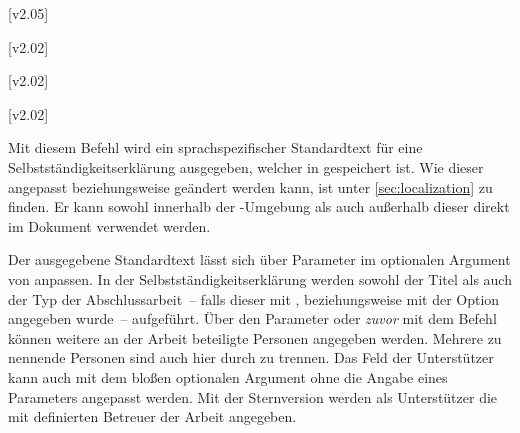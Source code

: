 \begin{DeclareEntity*}{}
\begin{DeclareEntity*}{}
\begin{DeclareEntity*}{}
\begin{Declaration}
  {}
\begin{Declaration}
  {}
  [v2.05]
\begin{Declaration}
  {}
\begin{Declaration}
  {}
\begin{Declaration}
  {}
\begin{Declaration}
  {}
\begin{Declaration}
  {}
  [v2.02]
\begin{Declaration}
  {}
  [v2.02]
\begin{Declaration}
  {}
  [v2.02]
\begin{Declaration}
  {}
\printdeclarationlist[Datum]

Mit diesem Befehl wird ein sprachspezifischer Standardtext für eine 
Selbstständigkeitserklärung ausgegeben, welcher in  
gespeichert ist. Wie dieser angepasst beziehungsweise geändert werden kann, ist 
unter \autoref{sec:localization} zu finden. Er kann sowohl innerhalb der 
-Umgebung als auch außerhalb dieser direkt im 
Dokument verwendet werden. 

Der ausgegebene Standardtext lässt sich über Parameter im optionalen Argument 
von  anpassen. In der Selbstständigkeitserklärung werden 
sowohl der Titel als auch der Typ der Abschlussarbeit~-- falls dieser mit 
,  beziehungsweise 
mit der Option  angegeben wurde~-- aufgeführt. Über den 
Parameter  oder \emph{zuvor} mit dem 
Befehl  können weitere an der Arbeit beteiligte Personen 
angegeben werden. Mehrere zu nennende Personen sind auch hier durch  
zu trennen. Das Feld der Unterstützer kann auch mit dem bloßen optionalen 
Argument ohne die Angabe eines Parameters angepasst werden. 
%
Mit der Sternversion  werden als Unterstützer die mit 
 definierten Betreuer der Arbeit angegeben.


\end{Declaration}
\end{Declaration}
\end{Declaration}
\end{Declaration}
\end{Declaration}
\end{Declaration}
\end{Declaration}
\end{Declaration}
\end{Declaration}
\end{Declaration}
\end{DeclareEntity*}
\end{DeclareEntity*}
\end{DeclareEntity*}
